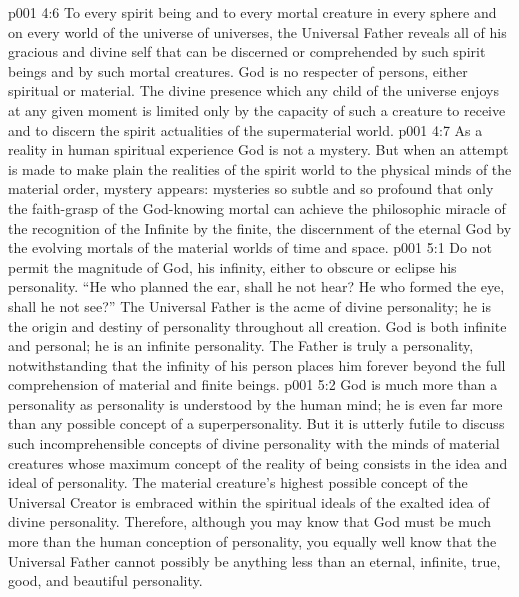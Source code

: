 \vs p001 4:6 To every spirit being and to every mortal creature in every sphere and on every world of the universe of universes, the Universal Father reveals all of his gracious and divine self that can be discerned or comprehended by such spirit beings and by such mortal creatures. God is no respecter of persons, either spiritual or material. The divine presence which any child of the universe enjoys at any given moment is limited only by the capacity of such a creature to receive and to discern the spirit actualities of the supermaterial world.
\vs p001 4:7 As a reality in human spiritual experience God is not a mystery. But when an attempt is made to make plain the realities of the spirit world to the physical minds of the material order, mystery appears: mysteries so subtle and so profound that only the faith\hyp{}grasp of the God\hyp{}knowing mortal can achieve the philosophic miracle of the recognition of the Infinite by the finite, the discernment of the eternal God by the evolving mortals of the material worlds of time and space.
\vs p001 5:1 Do not permit the magnitude of God, his infinity, either to obscure or eclipse his personality. “He who planned the ear, shall he not hear? He who formed the eye, shall he not see?” The Universal Father is the acme of divine personality; he is the origin and destiny of personality throughout all creation. God is both infinite and personal; he is an infinite personality. The Father is truly a personality, notwithstanding that the infinity of his person places him forever beyond the full comprehension of material and finite beings.
\vs p001 5:2 God is much more than a personality as personality is understood by the human mind; he is even far more than any possible concept of a superpersonality. But it is utterly futile to discuss such incomprehensible concepts of divine personality with the minds of material creatures whose maximum concept of the reality of being consists in the idea and ideal of personality. The material creature’s highest possible concept of the Universal Creator is embraced within the spiritual ideals of the exalted idea of divine personality. Therefore, although you may know that God must be much more than the human conception of personality, you equally well know that the Universal Father cannot possibly be anything less than an eternal, infinite, true, good, and beautiful personality.
